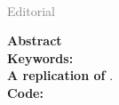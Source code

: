 %
~\\ {\sf \large \textcolor{gray}{Editorial}}
%
%
{\let\newpage\relax\maketitle} \maketitle

%
{\sf \bfseries Abstract} \articleABSTRACT\\

{\sf \bfseries Keywords:} \articleKEYWORDS\\

%
{\sf \bfseries A replication of}
                            {\href{\replicationURL}{\sf \replicationBIB}}.\\

{\sf \bfseries Code:}
   \href{\codeURL}{\sf \codeURL}
   \\


\vfill

